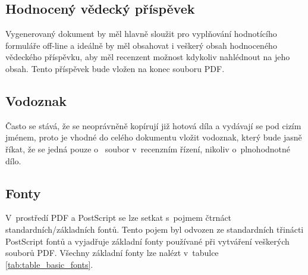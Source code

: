 \subsection{Hodnocený vědecký příspěvek}
Vygenerovaný dokument by měl hlavně sloužit pro vyplňování hodnotícího formuláře off-line a ideálně by měl obsahovat i veškerý obsah hodnoceného vědeckého příspěvku, aby měl recenzent možnost kdykoliv nahlédnout na jeho obsah. Tento příspěvek bude vložen na konec souboru PDF.

\subsection{Vodoznak}
Často se stává, že se neoprávněně kopírují již hotová díla a vydávají se pod cizím jménem, proto je vhodné do celého dokumentu vložit vodoznak, který bude jasně říkat, že se jedná pouze o~ soubor v~recenzním řízení, nikoliv o~plnohodnotné dílo.

\subsection{Fonty}
\label{subsec:fonty}
V~prostředí PDF a PostScript se lze setkat s~pojmem čtrnáct standardních/základních fontů. Tento pojem byl odvozen ze standardních třinácti PostScript fontů a vyjadřuje základní fonty používané při vytváření veškerých souborů PDF. Všechny základní fonty lze nalézt v~tabulce \ref{tab:table_basic_fonts}.

